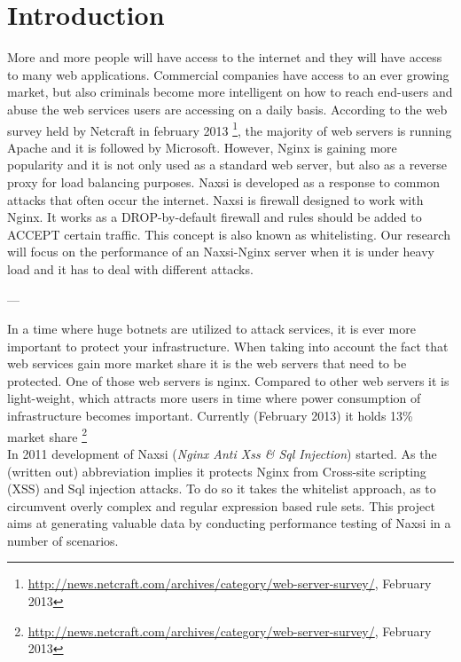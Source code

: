 \documentclass[Introduction]{subfiles}
\begin{document}
\section{Introduction}
\label{sec:Introduction}
More and more people will have access to the internet \cite{TODO: CLAIM} and they will have access to many web applications. Commercial companies have access to an ever growing market, but also criminals become more intelligent on how to reach end-users and abuse the web services users are accessing on a daily basis.
According to the web survey held by Netcraft in february 2013 \footnote{\url{http://news.netcraft.com/archives/category/web-server-survey/}, February 2013}, the majority of web servers is running Apache and it is followed by Microsoft. However, Nginx is gaining more popularity and it is not only used as a standard web server, but also as a reverse proxy for load balancing purposes. Naxsi is developed as a response to common attacks that often occur the internet. Naxsi is firewall designed to work with Nginx. It works as a DROP-by-default firewall and rules should be added to ACCEPT certain traffic. This concept is also known as whitelisting.
Our research will focus on the performance of an Naxsi-Nginx server when it is under heavy load and it has to deal with different attacks.

---

In a time where huge botnets are utilized to attack services, it is ever more important to protect your infrastructure. When taking into account the fact that web services gain more market share it is the web servers that need to be protected. One of those web servers is nginx. Compared to other web servers it is
light-weight, which attracts more users in time where power consumption of infrastructure becomes important. Currently (February 2013) it holds 13\% market share \footnote{\url{http://news.netcraft.com/archives/category/web-server-survey/}, February 2013}\\ In 2011 development of Naxsi (\emph{Nginx Anti Xss \& Sql Injection}) started. As the (written
out) abbreviation implies it protects Nginx from Cross-site scripting (XSS) and Sql injection attacks. To do so it takes the whitelist approach, as to circumvent overly complex and regular expression based rule sets. This project aims at generating valuable data by conducting performance testing
of Naxsi in a number of scenarios.
\end{document}
